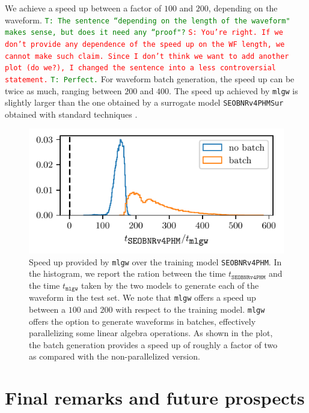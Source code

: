 \documentclass[twocolumn,showpacs,preprintnumbers,nofootinbib,prd,
superscriptaddress,10pt]{revtex4-1}
\newcommand{\stefano}[1]{{\textcolor{red}{\texttt{S: #1}} }}
\newcommand{\tim}[1]{{\textcolor{green}{\texttt{T: #1}} }}
\begin{document}
{We achieve a speed up between a factor of $100$ and $200$, depending on the waveform. \tim{The sentence ``depending on the length of the waveform" makes sense, but does it need any ``proof"?} \stefano{You're right. If we don't provide any dependence of the speed up on the WF length, we cannot make such claim. Since I don't think we want to add another plot (do we?), I changed the sentence into a less controversial statement.} \tim{Perfect.}
For waveform batch generation, the speed up can be twice as much, ranging between $200$ and $400$.
The speed up achieved by \texttt{mlgw} is slightly larger than the one obtained by a surrogate model \texttt{SEOBNRv4PHMSur} obtained with standard techniques \cite{Gadre:2022sed}.

\begin{figure}[t]
	\centering
	\includegraphics[scale = 1]{timing}
	\caption{Speed up provided by \texttt{mlgw} over the training model \texttt{SEOBNRv4PHM}.
	In the histogram, we report the ration between the time $t_\texttt{SEOBNRv4PHM}$ and the time $t_\texttt{mlgw}$ taken by the two models to generate each of the waveform in the test set.
	We note that \texttt{mlgw} offers a speed up between a $100$ and $200$ with respect to the training model.
	\texttt{mlgw} offers the option to generate waveforms in batches, effectively parallelizing some linear algebra operations. As shown in the plot, the batch generation provides a speed up of roughly a factor of two as compared with the non-parallelized version.
	}
	\label{fig:timing_hist}
\end{figure}


\section{Final remarks and future prospects}
\label{sec:end}

}
\end{document}
